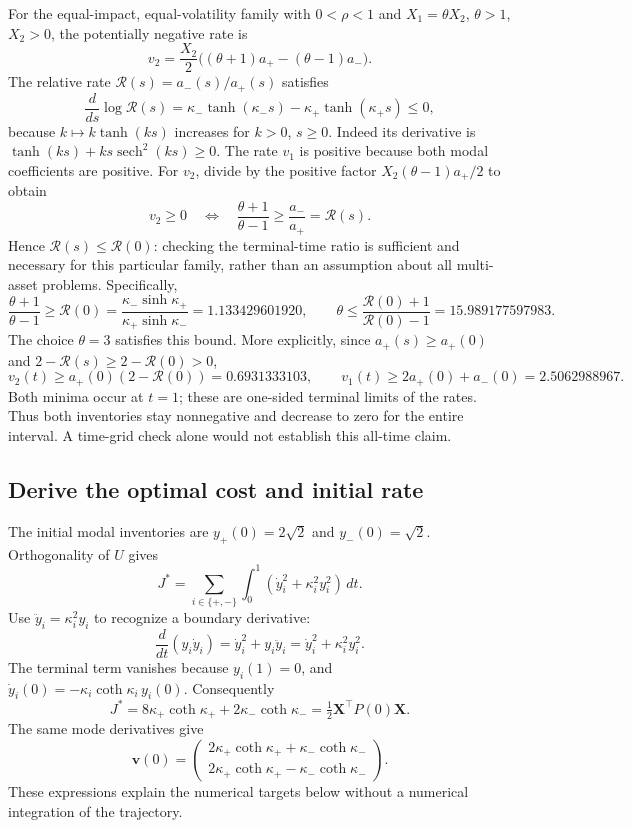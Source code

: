For the equal-impact, equal-volatility family with $0<\rho<1$ and
$X_1=\theta X_2$, $\theta>1$, $X_2>0$, the potentially negative rate is
\[
 v_2=\frac{X_2}{2}\big((\theta+1)a_+-(\theta-1)a_-\big).
\]
The relative rate $\mathcal R(s)=a_-(s)/a_+(s)$ satisfies
\[
 \frac{d}{ds}\log \mathcal R(s)
 =\kappa_-\tanh(\kappa_-s)-\kappa_+\tanh(\kappa_+s)\le0,
\]
because $k\mapsto k\tanh(ks)$ increases for $k>0$, $s\ge0$.
Indeed its derivative is
$\tanh(ks)+ks\operatorname{sech}^2(ks)\ge0$.
The rate $v_1$ is positive because both modal coefficients are positive.
For $v_2$, divide by the positive factor
$X_2(\theta-1)a_+/2$ to obtain
\[
 v_2\ge0\quad\Longleftrightarrow\quad
 \frac{\theta+1}{\theta-1}\ge\frac{a_-}{a_+}=\mathcal R(s).
\]
Hence $\mathcal R(s)\le \mathcal R(0)$: checking the terminal-time ratio is sufficient and
necessary for this particular family, rather than an assumption about all
multi-asset problems. Specifically,
\begin{equation}
 \frac{\theta+1}{\theta-1}\ge
 \mathcal R(0)=\frac{\kappa_-\sinh\kappa_+}{\kappa_+\sinh\kappa_-}
 =1.133429601920,
 \qquad
 \theta\le\frac{\mathcal R(0)+1}{\mathcal R(0)-1}=15.989177597983.
 \label{eq:stage3-bound}
\end{equation}
The choice $\theta=3$ satisfies this bound. More explicitly, since
$a_+(s)\ge a_+(0)$ and $2-\mathcal R(s)\ge2-\mathcal R(0)>0$,
\[
 v_2(t)\ge a_+(0)(2-\mathcal R(0))=0.6931333103,
 \qquad v_1(t)\ge2a_+(0)+a_-(0)=2.5062988967.
\]
Both minima occur at $t=1$; these are one-sided terminal limits of the rates.
Thus both inventories stay nonnegative and decrease to zero for the entire
interval. A time-grid check alone would not establish this all-time claim.

\subsection*{Derive the optimal cost and initial rate}

The initial modal inventories are $y_+(0)=2\sqrt2$ and
$y_-(0)=\sqrt2$. Orthogonality of $U$ gives
\[
 J^*=\sum_{i\in\{+,-\}}\int_0^1
 (\dot y_i^2+\kappa_i^2y_i^2)\,dt.
\]
Use $\ddot y_i=\kappa_i^2y_i$ to recognize a boundary derivative:
\[
 \frac{d}{dt}(y_i\dot y_i)=\dot y_i^2+y_i\ddot y_i
 =\dot y_i^2+\kappa_i^2y_i^2.
\]
The terminal term vanishes because $y_i(1)=0$, and
$\dot y_i(0)=-\kappa_i\coth\kappa_i\,y_i(0)$. Consequently
\begin{equation}
 \boxed{J^*=8\kappa_+\coth\kappa_+
              +2\kappa_-\coth\kappa_-
 =\tfrac12\mathbf X^\top P(0)\mathbf X.}
 \label{eq:stage3-cost}
\end{equation}
The same mode derivatives give
\[
 \mathbf v(0)=
 \begin{pmatrix}
 2\kappa_+\coth\kappa_++\kappa_-\coth\kappa_-\\
 2\kappa_+\coth\kappa_+-\kappa_-\coth\kappa_-
 \end{pmatrix}.
\]
These expressions explain the numerical targets below without a
numerical integration of the trajectory.

